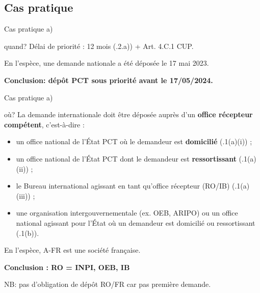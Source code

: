 
\subsection{Cas pratique}

\begin{frame}{Cas pratique a)}

\begin{block}{quand?}
Délai de priorité : 12 mois (.2.a)) + Art. 4.C.1 CUP.
\end{block}

En l'espèce, une demande nationale a été déposée le 17 mai 2023.\newline

\textbf{Conclusion: dépôt PCT sous priorité avant le 17/05/2024.}

\end{frame}

\begin{frame}{Cas pratique a)}

\begin{block}{où?}
La demande internationale doit être déposée auprès d’un \textbf{office récepteur compétent},
c’est-à-dire :

\begin{itemize}
  \item un office national de l’État PCT où le demandeur est \textbf{domicilié}
  (.1(a)(i)) ;

  \item un office national de l’État PCT dont le demandeur est \textbf{ressortissant}
  (.1(a)(ii)) ;

  \item le Bureau international agissant en tant qu’office récepteur (RO/IB)
  (.1(a)(iii)) ;

  \item une organisation intergouvernementale (ex. OEB, ARIPO) ou un office national
  agissant pour l’État où un demandeur est domicilié ou ressortissant
  (.1(b)).
\end{itemize}
\end{block}

En l'espèce, A-FR est une société française. \newline

\textbf{Conclusion : RO = INPI, OEB, IB}

NB: pas d'obligation de dépôt RO/FR car pas première demande.

\end{frame}

